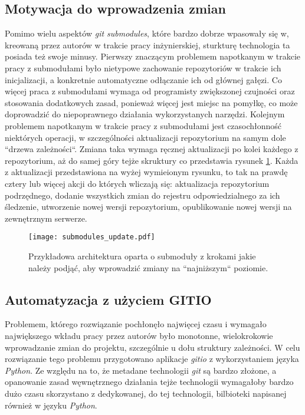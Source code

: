 \subsection{Motywacja do wprowadzenia zmian}

Pomimo wielu aspektów \emph{git submodules}, które bardzo dobrze wpasowały się w, kreowaną przez autorów w trakcie pracy inżynierskiej, sturkturę technologia ta posiada też swoje minusy. Pierwszy znaczącym problemem napotkanym w trakcie pracy z submodułami było nietypowe zachowanie repozytoriów w trakcie ich inicjalizacji, a konkretnie automatyczne odłączanie ich od głównej gałęzi. Co więcej praca z submodułami wymaga od programisty zwiększonej czujności oraz stosowania dodatkowych zasad, ponieważ więcej jest miejsc na pomyłkę, co może doprowadzić do niepoprawnego działania wykorzystanych narzędzi. Kolejnym problemem napotkanym w trakcie pracy z submodułami jest czasochłonność niektórych operacji, w szczególności aktualizacji repozytorium na samym dole ``drzewa zależności``. Zmiana taka wymaga ręcznej aktualizacji po kolei każdego z repozytorium, aż do samej góry tejże skruktury co przedstawia rysunek \ref {fig:submodules_update}. Każda z aktualizacji przedstawiona na wyżej wymieionym rysunku, to tak na prawdę cztery lub więcej akcji do których wliczają się: aktualizacja repozytorium podrzędnego, dodanie wszystkich zmian do rejestru odpowiedzialnego za ich śledzenie, utworzenie nowej wersji repozytorium, opublikowanie nowej wersji na zewnętrznym serwerze.



\clearpage
\begin{figure}[H]
    \centering
    \texttt{[image: submodules\_update.pdf]}
    \caption{Przykładowa architektura oparta o submoduły z krokami jakie należy podjąć, aby wprowadzić zmiany na ``najniższym`` poziomie.}
    \label{fig:submodules_update}
\end{figure}


\subsection{Automatyzacja z użyciem GITIO}

Problemem, którego rozwiązanie pochłonęło najwięcej czasu i wymagało największego wkładu pracy przez autorów było monotonne, wielokrokowie wprowadzanie zmian do projektu, szczególnie u dołu struktury zależności. W celu rozwiązanie tego problemu przygotowano aplikacje \emph{gitio} z wykorzystaniem języka \emph{Python}. Ze względu na to, że metadane technologii \emph{git} są bardzo złożone, a opanowanie zasad węwnętrznego działania tejże technologii wymagałoby bardzo dużo czasu skorzystano z dedykowanej, do tej technologii, bilbioteki napisanej również w języku \emph{Python}.


